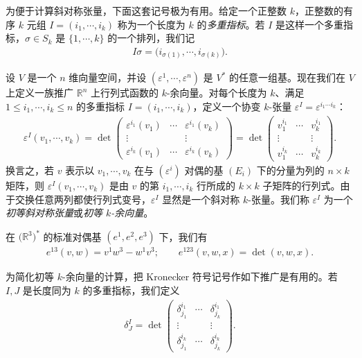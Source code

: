 \documentclass[../../main.tex]{subfiles}
\begin{document}
为便于计算斜对称张量，下面这套记号极为有用。给定一个正整数 $k$，正整数的有序 $k$ 元组 $I=(i_1,\cdots ,i_k)$ 称为一个长度为 $k$ 的\emph{多重指标}。若 $I$ 是这样一个多重指标，$\sigma\in S_k$ 是 $\{1,\cdots ,k\}$ 的一个排列，我们记
\begin{align*}
I\sigma=\bigl(i_{\sigma(1)},\cdots ,i_{\sigma(k)}\bigr).
\end{align*}

设 $V$ 是一个 $n$ 维向量空间，并设 $(\varepsilon^1,\cdots ,\varepsilon^n)$ 是 $V^*$ 的任意一组基。现在我们在 $V$ 上定义一族推广 $\mathbb{R}^n$ 上行列式函数的 $k$-余向量。对每个长度为 $k$、满足 $1\leqslant i_1,\cdots ,i_k\leqslant n$ 的多重指标 $I=(i_1,\cdots ,i_k)$，定义一个协变 $k$-张量 $\varepsilon^I=\varepsilon^{i_1\cdots  i_k}$：
\begin{align}
\varepsilon^I(v_1,\cdots ,v_k)
=\det\begin{pmatrix}
\varepsilon^{i_1}(v_1)&\cdots&\varepsilon^{i_1}(v_k)\\
\vdots&&\vdots\\
\varepsilon^{i_k}(v_1)&\cdots&\varepsilon^{i_k}(v_k)
\end{pmatrix}
=\det\begin{pmatrix}
v^{i_1}_1&\cdots&v^{i_1}_k\\
\vdots&&\vdots\\
v^{i_k}_1&\cdots&v^{i_k}_k
\end{pmatrix}.\label{align:ch14-elem}
\end{align}
换言之，若 $v$ 表示以 $v_1,\cdots ,v_k$ 在与 $(\varepsilon^i)$ 对偶的基 $(E_i)$ 下的分量为列的 $n\times k$ 矩阵，则 $\varepsilon^I(v_1,\cdots ,v_k)$ 是由 $v$ 的第 $i_1,\cdots ,i_k$ 行所成的 $k\times k$ 子矩阵的行列式。由于交换任意两列都使行列式变号，$\varepsilon^I$ 显然是一个斜对称 $k$-张量。我们称 $\varepsilon^I$ 为一个\emph{初等斜对称张量}或\emph{初等 $k$-余向量}。

\begin{example}\label{example:ch14-elementary}
在 $\bigl(\mathbb{R}^3\bigr)^*$ 的标准对偶基 $(e^1,e^2,e^3)$ 下，我们有
\begin{align*}
e^{13}(v,w)=v^1w^3-w^1v^3;\qquad
e^{123}(v,w,x)=\det(v,w,x).
\end{align*}
\end{example}

为简化初等 $k$-余向量的计算，把 Kronecker 符号记号作如下推广是有用的。若 $I,J$ 是长度同为 $k$ 的多重指标，我们定义
\begin{align*}
\delta^I_J=\det\begin{pmatrix}
\delta^{i_1}_{j_1}&\cdots&\delta^{i_1}_{j_k}\\
\vdots&&\vdots\\
\delta^{i_k}_{j_1}&\cdots&\delta^{i_k}_{j_k}
\end{pmatrix}.
\end{align*}
\end{document}
